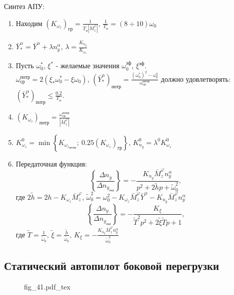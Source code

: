 \documentclass{article}
\begin{document}
Синтез АПУ:
\begin{enumerate}
	\item Находим $(K_{\omega_z})_\text{гр} =\frac{1}{T_\text{п}
		      |\bar{M}_z^{\varphi}|}$, $\frac{1}{T_\text{п}} = (8 \div 10)\omega_0$
	\item $\bar{Y}_*^\alpha =\bar{Y}^\alpha + \lambda n_y^\alpha$, $\lambda =
		      \frac{K_{n_y}}{K_{\omega_z}}$
	\item Пусть $\omega_0^*$, $\xi^*$ - желаемые значения
	      $\omega_0^{\text{эф}}$, $\xi^{\text{эф}}$.\\
	      $\omega_\text{ср}^\text{потр} = 2 (\xi_* \omega_0^* - \xi \omega_0)$,
	      $(\bar{Y}_*^\alpha)_\text{потр} = \frac{(\omega_0^*)^2 -
			      \omega_0^2}{\omega_\text{ср}^\text{потр}}$
	      должно удовлетворять: $(\bar{Y}_*^\alpha)_\text{потр} \leq
		      \frac{0.2}{T_\text{п}}$.
	\item $(K_{\omega_z})_\text{потр} =
		      \frac{\omega_\text{ср}^\text{потр}}{|\bar{M}_z^\varphi|}$
	\item $K_{\omega_z}^0 = \min \left\{ K_{{\omega_z}_\text{потр}};\
		      0.25(K_{\omega_z})_\text{гр} \right\}$, $K_{n_y}^0 = \lambda^0
		      K_{\omega_z}^0$
	\item Передаточная функция:
	      \[
		      \left\{\frac{\Delta n_y}{\Delta n_{y_\text{зад}}} \right\}  =
		      -\frac{K_{n_y}\bar{M}_z^\varphi n_y^\alpha }{p^2 + 2 \tilde{h} p
			      + \tilde{\omega}_0^2},
	      \]
	      где $2 \tilde{h} = 2h - K_{\omega_z} \bar{M}_z^\varphi$,
	      $\tilde{\omega}^{2}_0= \omega_0^2 - K_{\omega_z} \bar{M}_z^\varphi
		      \bar{Y}^\alpha - K_{n_y} \bar{M}_z^\varphi n_y^\alpha$
	      \[
		      \left\{\frac{\Delta n_y}{\Delta n_{y_\text{зад}}} \right\} =
		      -\frac{K_{\xi}}{\tilde{T}^2 p^2 + 2 \tilde{\xi} \tilde{T}p + 1},
	      \]
	      где $\tilde{T} = \frac{1}{\tilde{\omega}_0}$, $\tilde{\xi}
		      =\frac{\tilde{h}}{\tilde{\omega_{0}}}$, $K_\xi = -\frac{K_{n_y}
			      \bar{M}_z^\varphi n_y^\alpha}{\tilde{\omega}_0^2}$
\end{enumerate}

\subsection{Статический автопилот боковой перегрузки}

\begin{figure}[H]
	\centering
	{fig_41.pdf_tex}
\end{figure}
\end{document}

